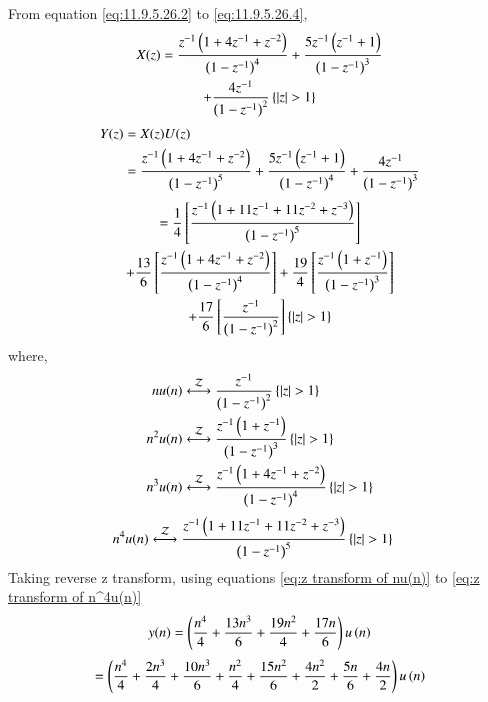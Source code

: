 \documentclass[journal,12pt,twocolumn]{IEEEtran}
\theoremstyle{remark}
\begin{document}
From equation \eqref{eq:11.9.5.26.2} to \eqref{eq:11.9.5.26.4},\\
    \begin{multline}
        X(z) = \frac{z^{-1}\left(1+4z^{-1}+z^{-2}\right)}{\left(1-z^{-1}\right)^4} + \frac{5z^{-1}\left(z^{-1}+1\right)}{\left(1-z^{-1}\right)^3}\\ 
        + \frac{4z^{-1}}{\left(1-z^{-1}\right)^2} \left\{\left\vert z\right\vert>1\right\}
    \end{multline}
    \begin{align}
         Y(z) &= X(z)U(z)\\
         &=\frac{z^{-1}\left(1+4z^{-1}+z^{-2}\right)}{\left(1-z^{-1}\right)^5} + \frac{5z^{-1}\left(z^{-1}+1\right)}{\left(1-z^{-1}\right)^4} + \frac{4z^{-1}}{\left(1-z^{-1}\right)^3} 
    \end{align}
    \begin{multline}
        = \frac{1}{4}{}\left[\frac{z^{-1}\left(1+11z^{-1}+11z^{-2}+z^{-3}\right)}{\left(1-z^{-1}\right)^5}\right] \\
        +\frac{13}{6}{}\left[\frac{z^{-1}\left(1+4z^{-1}+z^{-2}\right)}{\left(1-z^{-1}\right)^4}\right] + \frac{19}{4}{}\left[\frac{z^{-1}\left(1+z^{-1}\right)}{\left(1-z^{-1}\right)^3}\right]\\
        + \frac{17}{6}{}\left[\frac{z^{-1}}{\left(1-z^{-1}\right)^2}\right] \left\{\left\vert z\right\vert>1\right\}
    \end{multline}
    where,
    \begin{align}
        n u(n) &\system{Z} \frac{z^{-1}}{\brak{1-z^{-1}}^2} \cbrak{\abs{z}>1} \label{eq:z transform of nu(n)} \\
        n^2 u(n) &\system{Z} \frac{z^{-1}\brak{1+z^{-1}}}{\brak{1-z^{-1}}^3} \cbrak{\abs{z}>1}\label{eq:z transform of n^2u(n)} \\
        n^3 u(n) &\system{Z} \frac{z^{-1}\brak{1+4z^{-1}+z^{-2}}}{\brak{1-z^{-1}}^4} \cbrak{\abs{z}>1}\label{eq:z transform of n^3u(n)} 
    \end{align}
    \begin{align}
        n^4 u(n) &\system{Z} \frac{z^{-1}\brak{1+11z^{-1}+11z^{-2}+z^{-3}}}{\brak{1-z^{-1}}^5} \cbrak{\abs{z}>1}\label{eq:z transform of n^4u(n)}
    \end{align}
    Taking reverse z transform, using equations \eqref{eq:z transform of nu(n)} to \eqref{eq:z transform of n^4u(n)}
    \begin{align}
        y(n) = \left(\frac{n^4}{4} + \frac{13n^3}{6} + \frac{19n^2}{4} + \frac{17n}{6}\right) u\left(n\right)
    \end{align}
    \begin{multline}
        = \left(\frac{n^4}{4} + \frac{2n^3}{4} + \frac{10n^3}{6} + \frac{n^2}{4} + \frac{15n^2}{6} + \frac{4n^2}{2} + \frac{5n}{6} + \frac{4n}{2}\right) u\left(n\right)
    \end{multline}
\end{document}
